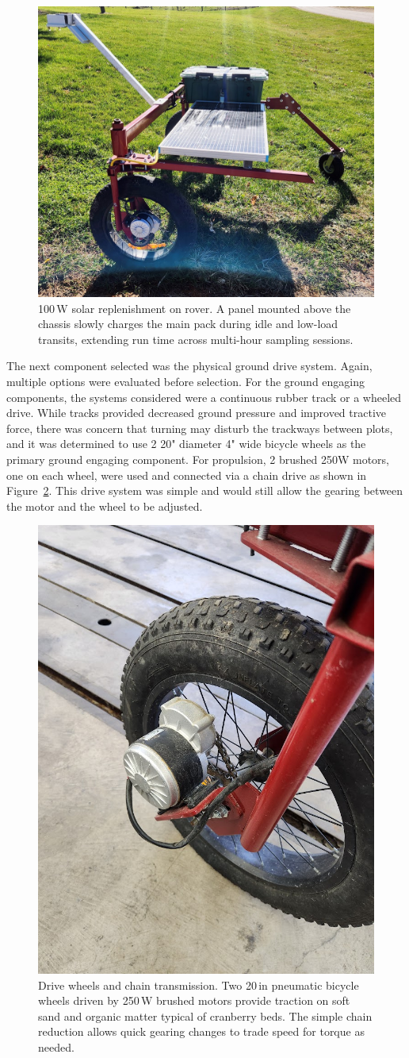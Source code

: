 \begin{figure}[!ht]
    \centering
    \includegraphics[width=0.5\linewidth]{images/Solar Panel.jpg}
    \caption{100\,W solar replenishment on rover. A panel mounted above the chassis slowly charges the main pack during idle and low-load transits, extending run time across multi-hour sampling sessions.}
    \label{solar-panel}
\end{figure}

The next component selected was the physical ground drive system. Again, multiple options were evaluated before selection. For the ground engaging components, the systems considered were a continuous rubber track or a wheeled drive. While tracks provided decreased ground pressure and improved tractive force, there was concern that turning may disturb the trackways between plots, and it was determined to use 2 20" diameter 4" wide bicycle wheels as the primary ground engaging component. For propulsion, 2 brushed 250W motors, one on each wheel, were used and connected via a chain drive as shown in Figure~\ref{fig:Wheel and drive}. This drive system was simple and would still allow the gearing between the motor and the wheel to be adjusted.

\begin{figure}[!ht]
    \centering
    \includegraphics[width=0.5\linewidth]{images/Drive Wheel.jpg}
    \caption{Drive wheels and chain transmission. Two 20\,in pneumatic bicycle wheels driven by 250\,W brushed motors provide traction on soft sand and organic matter typical of cranberry beds. The simple chain reduction allows quick gearing changes to trade speed for torque as needed.}
    \label{fig:Wheel and drive}
\end{figure}

